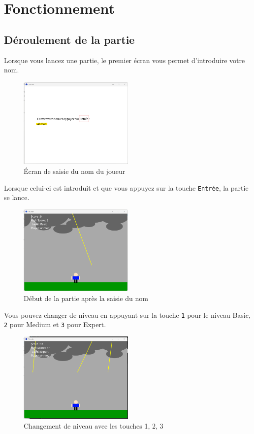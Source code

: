 \documentclass[a4paper,12pt]{article}
\begin{document}
	\section{Fonctionnement}
	
	\subsection{Déroulement de la partie}
	
	Lorsque vous lancez une partie, le premier écran vous permet d’introduire votre nom.
	\begin{figure}[H]
		\centering
		\includegraphics[width=0.5\textwidth]{1.png}
		\caption{Écran de saisie du nom du joueur}
	\end{figure}
	
	Lorsque celui-ci est introduit et que vous appuyez sur la touche \texttt{Entrée}, la partie se lance.
	\begin{figure}[H]
		\centering
		\includegraphics[width=0.5\textwidth]{2.png}
		\caption{Début de la partie après la saisie du nom}
	\end{figure}
	
	Vous pouvez changer de niveau en appuyant sur la touche \texttt{1} pour le niveau Basic, \texttt{2} pour Medium et \texttt{3} pour Expert.
	\begin{figure}[H]
		\centering
		\includegraphics[width=0.5\textwidth]{4.png}
		\caption{Changement de niveau avec les touches 1, 2, 3}
	\end{figure}
	
\end{document}
